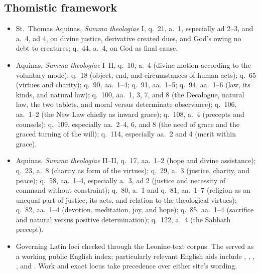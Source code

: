 \subsection*{Thomistic framework}

{\fontsize{8.6}{9.6}\selectfont
\begin{itemize}[itemsep=0pt,parsep=0pt,topsep=0.05em]
\item St.~Thomas Aquinas, \emph{Summa theologiae} I, q.~21, a.~1, especially ad 2--3, and a.~4, ad 4, on divine justice, derivative created dues, and God's owing no debt to creatures; q.~44, a.~4, on God as final cause.
\item Aquinas, \emph{Summa theologiae} I--II, q.~10, a.~4 (divine motion according to the voluntary mode); q.~18 (object, end, and circumstances of human acts); q.~65 (virtues and charity); q.~90, aa.~1--4; q.~91, aa.~1--5; q.~94, aa.~1--6 (law, its kinds, and natural law); q.~100, aa.~1, 3, 7, and 8 (the Decalogue, natural law, the two tablets, and moral versus determinate observance); q.~106, aa.~1--2 (the New Law chiefly as inward grace); q.~108, a.~4 (precepts and counsels); q.~109, especially aa.~2--4, 6, and 8 (the need of grace and the graced turning of the will); q.~114, especially aa.~2 and 4 (merit within grace).
\item Aquinas, \emph{Summa theologiae} II--II, q.~17, aa.~1--2 (hope and divine assistance); q.~23, a.~8 (charity as form of the virtues); q.~29, a.~3 (justice, charity, and peace); q.~58, aa.~1--4, especially a.~3, ad 2 (justice and necessity of command without constraint); q.~80, a.~1 and q.~81, aa.~1--7 (religion as an unequal part of justice, its acts, and relation to the theological virtues); q.~82, aa.~1--4 (devotion, meditation, joy, and hope); q.~85, aa.~1--4 (sacrifice and natural versus positive determination); q.~122, a.~4 (the Sabbath precept).
\item Governing Latin loci checked through the  Leonine-text corpus. The  served as a working public English index; particularly relevant English aids include , , , , and . Work and exact locus take precedence over either site's wording.
\end{itemize}}

